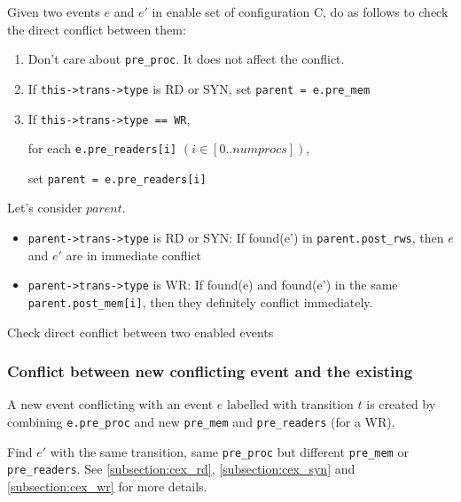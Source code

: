 \documentclass{llncs}
\begin{document}
	\begin{algorithm}{}

		Given two events $e$ and $e'$ in enable set of configuration C, 
		do as follows to check the direct conflict between them:
		\begin{enumerate}
		\item 
			Don't care about \verb!pre_proc!. It does not affect the conflict.
		\item
			If \verb!this->trans->type! is RD or SYN, set \verb!parent = e.pre_mem!
		\item
			If \verb!this->trans->type == WR!,
			
			for each \verb!e.pre_readers[i]! $(i \in [0..numprocs])$,
			
			set \verb!parent = e.pre_readers[i]!
			
		\end{enumerate}
		Let's consider $parent$.
		
		\begin{itemize}
			\item
			\verb!parent->trans->type! is RD or SYN: 
			If found(e') in \verb!parent.post_rws!, then $e$ and $e'$ are in immediate
			conflict
			\item
			\verb!parent->trans->type! is WR: If found(e) and found(e') in the same 
			\verb!parent.post_mem[i]!, then they definitely
			conflict immediately.
		\end{itemize}
		\noindent
		\caption{Check direct conflict between two enabled events}
		\label{a:dicfl}
	\end{algorithm}
	
\subsubsection{Conflict between new conflicting event and the existing\\}
\noindent
	A new event conflicting with an event $e$ labelled with transition $t$ is created by
	combining \verb!e.pre_proc! and new \verb!pre_mem! and \verb!pre_readers! (for a WR).

	Find $e'$ with the same transition, same \verb!pre_proc! but different \verb!pre_mem! or
	\verb!pre_readers!. See \cref{subsection:cex_rd}, \cref{subsection:cex_syn} and \cref{subsection:cex_wr} for more details.
	
\end{document}
